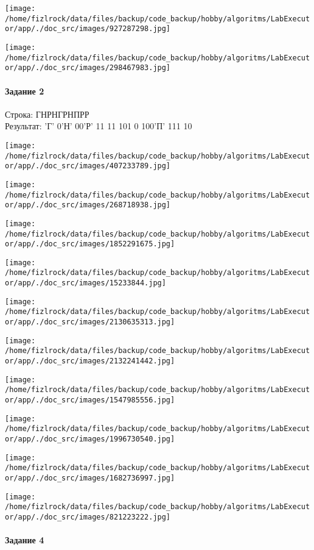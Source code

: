 \documentclass[a4paper, 12pt]{article}
\begin{document}
\texttt{[image: /home/fizlrock/data/files/backup/code\_backup/hobby/algoritms/LabExecutor/app/./doc\_src/images/927287298.jpg]}

\texttt{[image: /home/fizlrock/data/files/backup/code\_backup/hobby/algoritms/LabExecutor/app/./doc\_src/images/298467983.jpg]}
\pagebreak
\paragraph{Задание 2}

Строка: 
ГНРНГРНПРР\\
Результат: 'Г' 0'Н' 00'Р' 11 11 101 0 100'П' 111 10

\texttt{[image: /home/fizlrock/data/files/backup/code\_backup/hobby/algoritms/LabExecutor/app/./doc\_src/images/407233789.jpg]}

\texttt{[image: /home/fizlrock/data/files/backup/code\_backup/hobby/algoritms/LabExecutor/app/./doc\_src/images/268718938.jpg]}

\texttt{[image: /home/fizlrock/data/files/backup/code\_backup/hobby/algoritms/LabExecutor/app/./doc\_src/images/1852291675.jpg]}

\texttt{[image: /home/fizlrock/data/files/backup/code\_backup/hobby/algoritms/LabExecutor/app/./doc\_src/images/15233844.jpg]}

\texttt{[image: /home/fizlrock/data/files/backup/code\_backup/hobby/algoritms/LabExecutor/app/./doc\_src/images/2130635313.jpg]}

\texttt{[image: /home/fizlrock/data/files/backup/code\_backup/hobby/algoritms/LabExecutor/app/./doc\_src/images/2132241442.jpg]}

\texttt{[image: /home/fizlrock/data/files/backup/code\_backup/hobby/algoritms/LabExecutor/app/./doc\_src/images/1547985556.jpg]}

\texttt{[image: /home/fizlrock/data/files/backup/code\_backup/hobby/algoritms/LabExecutor/app/./doc\_src/images/1996730540.jpg]}

\texttt{[image: /home/fizlrock/data/files/backup/code\_backup/hobby/algoritms/LabExecutor/app/./doc\_src/images/1682736997.jpg]}

\texttt{[image: /home/fizlrock/data/files/backup/code\_backup/hobby/algoritms/LabExecutor/app/./doc\_src/images/821223222.jpg]}
\pagebreak
\paragraph{Задание 4}
\end{document}
